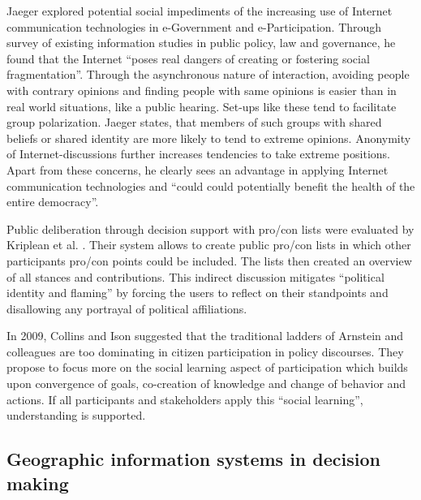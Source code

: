 Jaeger \cite{Jaeger2005_deliberate_democracy_and_egovernment} explored potential social impediments of the increasing use of Internet communication technologies in e-Government and e-Participation. Through survey of existing information studies in public policy, law and governance, he found that the Internet ``poses real dangers of creating or fostering social fragmentation''. Through the asynchronous nature of interaction, avoiding people with contrary opinions and finding people with same opinions is easier than in real world situations, like a public hearing. Set-ups like these tend to facilitate group polarization. Jaeger states, that members of such groups with shared beliefs or shared identity are more likely to tend to extreme opinions. Anonymity of Internet-discussions further increases tendencies to take extreme positions. Apart from these concerns, he clearly sees an advantage in applying Internet communication technologies and ``could could potentially benefit the health of the entire democracy''.

Public deliberation through decision support with pro/con lists were evaluated by Kriplean et al. \cite{Kriplean2012_Considerit}. Their system allows to create public pro/con lists in which other participants pro/con points could be included. The lists then created an overview of all stances and contributions. This indirect discussion mitigates ``political identity and flaming'' by forcing the users to reflect on their standpoints and disallowing any portrayal of political affiliations.

In 2009, Collins and Ison \cite{Collins2009_social_learning} suggested that the traditional ladders of Arnstein and colleagues are too dominating in citizen participation in policy discourses. They propose to focus more on the social learning aspect of participation which builds upon convergence of goals, co-creation of knowledge and change of behavior and actions. If all participants and stakeholders apply this ``social learning'', understanding is supported.%

\subsection{Geographic information systems in decision making}

